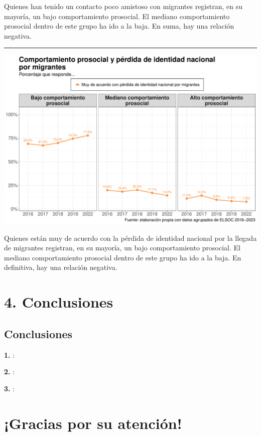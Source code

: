 \documentclass[
  spanish,
  letterpaper,
  DIV=11,
  numbers=noendperiod,
  oneside]{scrartcl}
\begin{document}
Quienes han tenido un contacto poco amistoso con migrantes registran, en
su mayoría, un bajo comportamiento prosocial. El mediano comportamiento
prosocial dentro de este grupo ha ido a la baja. En suma, hay una
relación negativa.

\begin{center}\rule{0.5\linewidth}{0.5pt}\end{center}

\begin{center}
\includegraphics[width=1\linewidth,height=\textheight,keepaspectratio]{cep_2025_files/figure-pdf/unnamed-chunk-12-1.pdf}
\end{center}

Quienes están muy de acuerdo con la pérdida de identidad nacional por la
llegada de migrantes registran, en su mayoría, un bajo comportamiento
prosocial. El mediano comportamiento prosocial dentro de este grupo ha
ido a la baja. En definitiva, hay una relación negativa.

\section{4. Conclusiones}\label{conclusiones}

\subsection{Conclusiones}\label{conclusiones-1}

\textbf{1. }:

\textbf{2. }:

\textbf{3. }:

\section{¡Gracias por su atención!}\label{gracias-por-su-atenciuxf3n}
\end{document}
